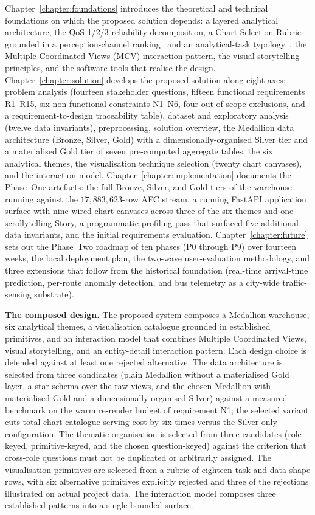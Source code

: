 Chapter~\ref{chapter:foundations} introduces the theoretical and
technical foundations on which the proposed solution depends: a
layered analytical architecture, the QoS-1/2/3 reliability
decomposition, a Chart Selection Rubric grounded in a perception-channel
ranking~\cite{cleveland1984} and an analytical-task
typology~\cite{munzner2014}, the Multiple Coordinated Views (MCV)
interaction pattern, the visual storytelling principles, and the
software tools that realise the design.
Chapter~\ref{chapter:solution} develops the proposed solution along
eight axes: problem analysis (fourteen stakeholder questions, fifteen
functional requirements R1--R15, six non-functional constraints
N1--N6, four out-of-scope exclusions, and a requirement-to-design
traceability table), dataset and exploratory analysis (twelve data
invariants), preprocessing, solution overview, the Medallion data
architecture (Bronze, Silver, Gold) with a dimensionally-organised
Silver tier and a materialised Gold tier of seven pre-computed
aggregate tables, the six analytical themes, the visualisation
technique selection (twenty chart canvases), and the interaction model.
Chapter~\ref{chapter:implementation} documents the Phase~One
artefacts: the full Bronze, Silver, and Gold tiers of the warehouse
running against the \(17{,}883{,}623\)-row AFC stream, a running
FastAPI application surface with nine wired chart canvases across
three of the six themes and one scrollytelling Story, a programmatic
profiling pass that surfaced five additional data invariants, and
the initial requirements evaluation.
Chapter~\ref{chapter:future} sets out the Phase~Two roadmap of ten
phases (P0 through P9) over fourteen weeks, the local
deployment plan, the two-wave user-evaluation methodology, and three
extensions that follow from the historical foundation (real-time
arrival-time prediction, per-route anomaly detection, and bus
telemetry as a city-wide traffic-sensing substrate).

\medskip
\noindent\textbf{The composed design.}
The proposed system composes a Medallion warehouse, six analytical
themes, a visualisation catalogue grounded in established primitives,
and an interaction model that combines Multiple Coordinated Views,
visual storytelling, and an entity-detail interaction pattern. Each
design choice is defended against at least one rejected alternative.
The data architecture is selected from three candidates (plain
Medallion without a materialised Gold layer, a star schema over the
raw views, and the chosen Medallion with materialised Gold and a
dimensionally-organised Silver) against a measured benchmark on the
warm re-render budget of requirement N1; the selected variant cuts
total chart-catalogue serving cost by six times versus the Silver-only
configuration. The thematic
organisation is selected from three candidates (role-keyed,
primitive-keyed, and the chosen question-keyed) against the criterion
that cross-role questions must not be duplicated or arbitrarily
assigned. The visualisation primitives are selected from a rubric of
eighteen task-and-data-shape rows, with six alternative primitives
explicitly rejected and three of the rejections illustrated on actual
project data. The interaction model composes three established
patterns into a single bounded surface.

